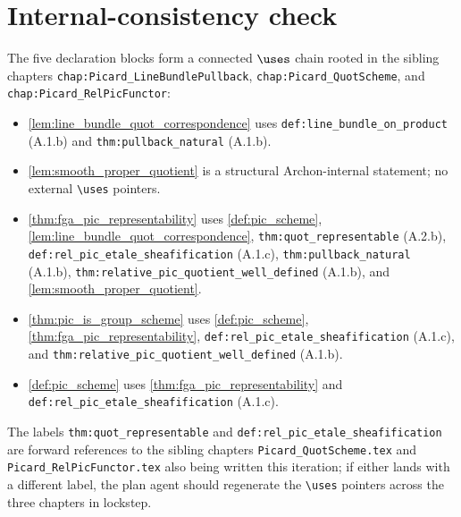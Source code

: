 \section{Internal-consistency check}
\label{sec:fga_pic_consistency_check}

The five declaration blocks form a connected \(\uses\) chain rooted in the
sibling chapters \texttt{chap:Picard\_LineBundlePullback},
\texttt{chap:Picard\_QuotScheme}, and \texttt{chap:Picard\_RelPicFunctor}:
\begin{itemize}
  \item \cref{lem:line_bundle_quot_correspondence} uses
    \texttt{def:line\_bundle\_on\_product} (A.1.b) and
    \texttt{thm:pullback\_natural} (A.1.b).
  \item \cref{lem:smooth_proper_quotient} is a structural Archon-internal
    statement; no external \texttt{\textbackslash uses} pointers.
  \item \cref{thm:fga_pic_representability} uses
    \cref{def:pic_scheme}, \cref{lem:line_bundle_quot_correspondence},
    \texttt{thm:quot\_representable} (A.2.b),
    \texttt{def:rel\_pic\_etale\_sheafification} (A.1.c),
    \texttt{thm:pullback\_natural} (A.1.b),
    \texttt{thm:relative\_pic\_quotient\_well\_defined} (A.1.b), and
    \cref{lem:smooth_proper_quotient}.
  \item \cref{thm:pic_is_group_scheme} uses
    \cref{def:pic_scheme}, \cref{thm:fga_pic_representability},
    \texttt{def:rel\_pic\_etale\_sheafification} (A.1.c), and
    \texttt{thm:relative\_pic\_quotient\_well\_defined} (A.1.b).
  \item \cref{def:pic_scheme} uses
    \cref{thm:fga_pic_representability} and
    \texttt{def:rel\_pic\_etale\_sheafification} (A.1.c).
\end{itemize}
The labels \texttt{thm:quot\_representable} and
\texttt{def:rel\_pic\_etale\_sheafification} are forward references to
the sibling chapters \texttt{Picard\_QuotScheme.tex} and
\texttt{Picard\_RelPicFunctor.tex} also being written this iteration; if
either lands with a different label, the plan agent should regenerate
the \texttt{\textbackslash uses} pointers across the three chapters in lockstep.
